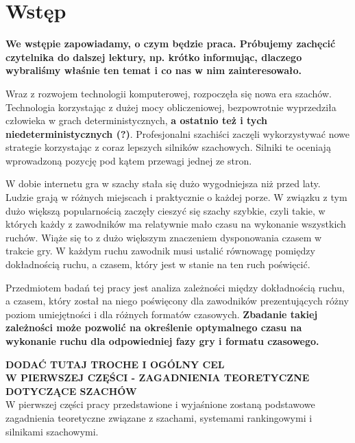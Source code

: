 \documentclass[inzynierska]{pwr_wmat_praca_dyplomowa}
\theoremstyle{plain}
\numberwithin{theorem}{chapter}
\theoremstyle{definition}
\numberwithin{theorem}{chapter}
\begin{document}

\frontmatter
\maketitle
\mainmatter
\tableofcontents

{\backmatter \chapter{Wstęp}}
\textbf{We wstępie zapowiadamy, o czym będzie praca. Próbujemy zachęcić czytelnika do dalszej lektury, np. krótko informując, dlaczego wybraliśmy właśnie ten temat i co nas w nim zainteresowało.}

Wraz z rozwojem technologii komputerowej, rozpoczęła się nowa era szachów. Technologia korzystając z dużej mocy obliczeniowej, bezpowrotnie wyprzedziła człowieka w grach deterministycznych,\textbf{ a ostatnio też i tych niedeterministycznych (?)}. Profesjonalni szachiści zaczęli wykorzystywać nowe strategie korzystając z coraz lepszych silników szachowych. Silniki te oceniają wprowadzoną pozycję pod kątem przewagi jednej ze stron. 

W dobie internetu gra w szachy stała się dużo wygodniejsza niż przed laty. Ludzie grają w różnych miejscach i praktycznie o każdej porze. W związku z tym dużo większą popularnością zaczęły cieszyć się szachy szybkie, czyli takie, w których każdy z zawodników ma relatywnie mało czasu na wykonanie wszystkich ruchów. Wiąże się to z dużo większym znaczeniem dysponowania czasem w trakcie gry. W każdym ruchu zawodnik musi ustalić równowagę pomiędzy dokładnością ruchu, a czasem, który jest w stanie na ten ruch poświęcić. 

Przedmiotem badań tej pracy jest analiza zależności między dokładnością ruchu, a czasem, który został na niego poświęcony dla zawodników prezentujących różny poziom umiejętności i dla różnych formatów czasowych.\textbf{ Zbadanie takiej zależności może pozwolić na określenie optymalnego czasu na wykonanie ruchu dla odpowiedniej fazy gry i formatu czasowego.}

\textbf{DODAĆ TUTAJ TROCHE I OGÓLNY CEL}\\


\textbf{W PIERWSZEJ CZĘŚCI - ZAGADNIENIA TEORETYCZNE DOTYCZĄCE SZACHÓW}\\
W pierwszej części pracy przedstawione i wyjaśnione zostaną podstawowe zagadnienia teoretyczne związane z szachami, systemami rankingowymi i silnikami szachowymi. 
\end{document}

